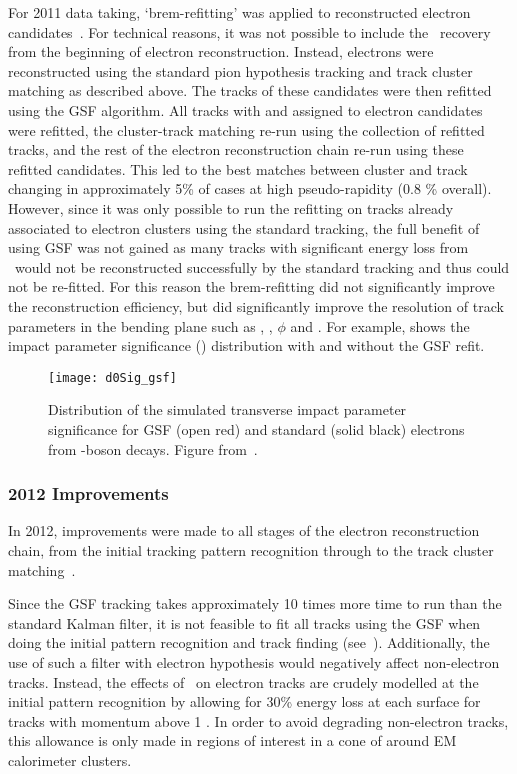 For 2011 data taking, `brem-refitting' was applied to
reconstructed electron candidates~\cite{ATLAS-CONF-2012-047}. For technical reasons, it was not possible to
include the \brem\ recovery from the beginning of electron reconstruction.
Instead, electrons were reconstructed using the standard pion hypothesis
tracking and track cluster matching as described above. The tracks of these candidates were then refitted
using the GSF algorithm. All tracks with  and  assigned to
electron candidates were refitted, the cluster-track matching re-run
using the collection of refitted tracks, and the rest of the electron reconstruction
chain re-run using these refitted candidates. This led to the best matches between
cluster and track changing in approximately 5\% of cases at high pseudo-rapidity (0.8 \%
overall). However, since it was only possible to run the refitting on tracks
already associated to electron clusters using the standard tracking, the full
benefit of using GSF was not gained as many tracks with significant energy loss
from \brem\ would not be reconstructed successfully by the standard tracking and
thus could not be re-fitted. For this reason the brem-refitting did not
significantly improve the reconstruction efficiency, but did significantly
improve the resolution of track parameters in the bending plane such as \dzero, \dzerosig,
$\phi$ and \qoverp. For example,  shows the impact parameter
significance (\dzerosig) distribution with and without the GSF refit. 

\begin{figure}[h]
\centering
            \texttt{[image: d0Sig\_gsf]}
\caption{
Distribution of the simulated transverse impact parameter significance for GSF (open
red) and standard (solid black) electrons from \Z-boson decays. 
Figure from~\cite{ATLAS-CONF-2012-047}.}
\label{fig:d0Sig-gsf}
\end{figure}

\subsubsection{2012 Improvements}

In 2012, improvements were made to all stages of the electron reconstruction
chain, from the initial tracking pattern recognition through to the track
cluster matching~\cite{HSG2:1456228}. 

Since the GSF tracking takes approximately 10 times more time to
run than the standard Kalman filter, it is not feasible to fit all tracks using
the GSF when doing the initial pattern recognition and track finding (see~). 
Additionally, the use of such a filter with electron hypothesis would
negatively affect non-electron tracks. Instead, the effects of \brem\ on
electron tracks are crudely modelled at the initial pattern recognition by allowing for 30\% energy loss at each surface for tracks with
momentum above 1 \gev. In order to avoid degrading non-electron tracks, this allowance is only made in regions of interest in a
cone of  around EM calorimeter clusters. 

